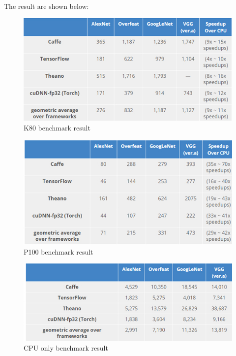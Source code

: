 \documentclass[conference]{IEEEtran}
\begin{document}
The result are shown below:

\begin{figure}[H]
\centering
  \begin{minipage}{.4\textwidth}
    \centering
    \includegraphics[width=1.0\linewidth]{k80_benchmark.jpg}
    \caption{K80 benchmark result}
    \label{fig:fig_1}
  \end{minipage}
\end{figure}

\begin{figure}[H]
\centering
  \begin{minipage}{.4\textwidth}
    \centering
    \includegraphics[width=1.0\linewidth]{P100_benchmark.jpg}
    \caption{P100 benchmark result}
    \label{fig:fig_1}
  \end{minipage}
\end{figure}

\begin{figure}[H]
\centering
  \begin{minipage}{.4\textwidth}
    \centering
    \includegraphics[width=1.0\linewidth]{cpu_only.jpg}
    \caption{CPU only benchmark result}
    \label{fig:fig_1}
  \end{minipage}
\end{figure}
\end{document}
